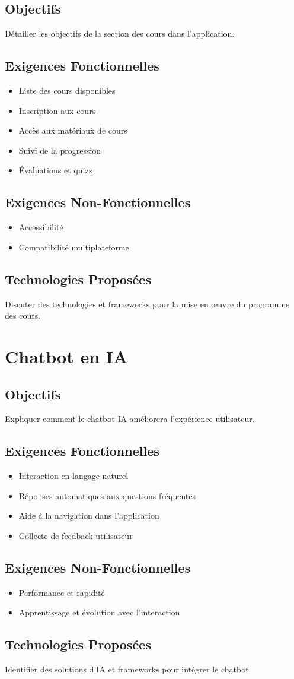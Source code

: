 \documentclass[12pt, letterpaper]{article}
\begin{document}
\subsection{Objectifs}
Détailler les objectifs de la section des cours dans l'application.
\subsection{Exigences Fonctionnelles}
\begin{itemize}
    \item Liste des cours disponibles
    \item Inscription aux cours
    \item Accès aux matériaux de cours
    \item Suivi de la progression
    \item Évaluations et quizz
\end{itemize}
\subsection{Exigences Non-Fonctionnelles}
\begin{itemize}
    \item Accessibilité
    \item Compatibilité multiplateforme
\end{itemize}
\subsection{Technologies Proposées}
Discuter des technologies et frameworks pour la mise en œuvre du programme des cours.

\section{Chatbot en IA}
\subsection{Objectifs}
Expliquer comment le chatbot IA améliorera l'expérience utilisateur.
\subsection{Exigences Fonctionnelles}
\begin{itemize}
    \item Interaction en langage naturel
    \item Réponses automatiques aux questions fréquentes
    \item Aide à la navigation dans l'application
    \item Collecte de feedback utilisateur
\end{itemize}
\subsection{Exigences Non-Fonctionnelles}
\begin{itemize}
    \item Performance et rapidité
    \item Apprentissage et évolution avec l'interaction
\end{itemize}
\subsection{Technologies Proposées}
Identifier des solutions d'IA et frameworks pour intégrer le chatbot.
\end{document}

